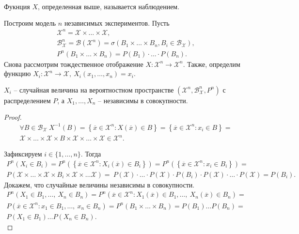 \begin{definition}
	Фукнция $\displaystyle X$, определенная выше, называется наблюдением.
\end{definition}
Построим модель $n$ независимых экспериментов. Пусть 
\begin{gather*}
    \mathcal{X}^{n} =\mathcal{X} \times \dotsc \times \mathcal{X},\\ \mathcal{B}_{\mathcal{X}}^{n} =\mathcal{B}\left(\mathcal{X}^{n}\right) =\sigma ( B_{1} \times \dotsc \times B_{n}, B_{i} \in \mathcal{B}_{\mathcal{X}}),\\ P^{n}( B_{1} \times \dotsc \times B_{n}) =P( B_{1}) \cdotp \dotsc \cdotp P( B_{n}).
\end{gather*}
Снова рассмотрим тождественное отображение $\displaystyle X:\mathcal{X}^{n}\rightarrow \mathcal{X}^{n}$. Также, определим функцию $\displaystyle X_{i} :\mathcal{X}^{n}\rightarrow \mathcal{X},\ X_{i}( x_{1} ,\dotsc ,x_{n}) =x_{i}$.
\begin{proposition}
	$\displaystyle X_{i}$ -- случайная величина на вероятностном пространстве $\displaystyle \left(\mathcal{X}^{n} ,\mathcal{B}_{\mathcal{X}}^{n} ,P^{n}\right)$ с распределением $\displaystyle P$, а $\displaystyle X_{1} ,\dotsc ,X_{n}$ -- независимы в совокупности.
\end{proposition}
\begin{proof}
    \begin{gather*}
        \forall B\in \mathcal{B}_{\mathcal{X}} \ X^{-1}( B) =\left\{\overline{x} \in \mathcal{X}^{n} :X(\overline{x}) \in B\right\} =\left\{\overline{x} \in \mathcal{X}^{n} :x_{i} \in B\right\} =\\ \mathcal{X} \times \dotsc \times \mathcal{X} \times B\times \mathcal{X} \times \dotsc \times \mathcal{X} \in \mathcal{X}^{n}.
    \end{gather*}

    Зафиксируем 
    $\displaystyle i\in \{1,\dotsc ,n\}$. Тогда
    \begin{gather*}
        P^{n}( X_{i} \in B_{i}) =P^{n}\left(\left\{\overline{x} \in \mathcal{X}^{n} :X_{i}(\overline{x}) \in B_{i}\right\}\right) =P^{n}\left(\left\{\overline{x} \in \mathcal{X}^{n} :x_{i} \in B_{i}\right\}\right) =\\ P(\mathcal{X} \times \dotsc \times \mathcal{X} \times B_{i} \times \mathcal{X} \times \dotsc \mathcal{X}) =\ P(\mathcal{X}) \cdot \dotsc \cdot P(\mathcal{X}) \cdot P( B_{i}) \cdot P(\mathcal{X}) \cdot \dotsc \cdot P(\mathcal{X}) =P( B_{i}).
    \end{gather*}
    Докажем, что случайные величины независимы в совокупности.
    \begin{gather*}
        P^{n}( X_{1} \in B_{1} ,\dotsc ,\ X_{n} \in B_{n}) =P^{n}\left(\overline{x} \in \mathcal{X}^{n} :X_{1}(\overline{x}) \in B_{1} ,\dotsc ,\ X_{n}(\overline{x}) \in B_{n}\right) =\\ P\left(\overline{x} \in \mathcal{X}^{n} :x_{1} \in B_{1} ,\dotsc ,\ x_{n} \in B_{n}\right) =P^{n}( B_{1} \times \dotsc \times B_{n}) =P( B_{1}) \dotsc P( B_{n}) =\\ P( X_{1} \in B_{1}) \dotsc P( X_{n} \in B_{n}).
    \end{gather*}
\end{proof}


